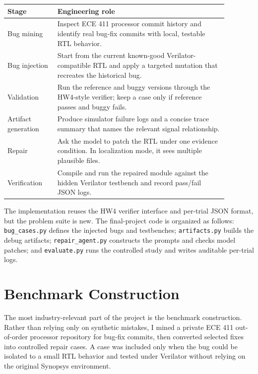 \documentclass[11pt]{article}
\begin{document}
\begin{center}
\small
\begin{tabular}{p{0.20\linewidth}p{0.68\linewidth}}
\toprule
Stage & Engineering role \\
\midrule
Bug mining & Inspect ECE 411 processor commit history and identify real bug-fix commits with local, testable RTL behavior. \\
Bug injection & Start from the current known-good Verilator-compatible RTL and apply a targeted mutation that recreates the historical bug. \\
Validation & Run the reference and buggy versions through the HW4-style verifier; keep a case only if reference passes and buggy fails. \\
Artifact generation & Produce simulator failure logs and a concise trace summary that names the relevant signal relationship. \\
Repair & Ask the model to patch the RTL under one evidence condition. In localization mode, it sees multiple plausible files. \\
Verification & Compile and run the repaired module against the hidden Verilator testbench and record pass/fail JSON logs. \\
\bottomrule
\end{tabular}
\end{center}

The implementation reuses the HW4 verifier interface and per-trial JSON format,
but the problem suite is new. The final-project code is organized as follows:
\texttt{bug\_cases.py} defines the injected bugs and testbenches;
\texttt{artifacts.py} builds the debug artifacts; \texttt{repair\_agent.py}
constructs the prompts and checks model patches; and \texttt{evaluate.py} runs
the controlled study and writes auditable per-trial logs.

\section*{Benchmark Construction}
The most industry-relevant part of the project is the benchmark construction.
Rather than relying only on synthetic mistakes, I mined a private ECE 411
out-of-order processor repository for bug-fix commits, then converted selected
fixes into controlled repair cases. A case was included only when the bug could
be isolated to a small RTL behavior and tested under Verilator without relying
on the original Synopsys environment.
\end{document}

